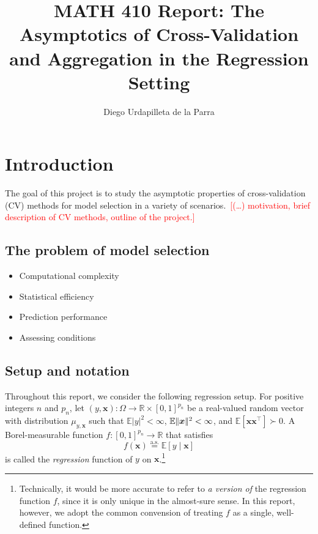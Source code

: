 \documentclass[11pt, letter paper]{article}
\title{MATH 410 Report: The Asymptotics of Cross-Validation and Aggregation in the Regression Setting}
\author{Diego Urdapilleta de la Parra}
\newcommand{\1}{\mathmybb{1}}
\newcommand{\R}{\mathbb{R}}
\newcommand{\0}{\emptyset}
\newcommand{\E}{\mathbb{E}}
\newcommand{\Ep}[1]{\mathbb{E}\left[ #1 \right]}
\newcommand{\norm}[1]{|\hspace{-1pt}|#1 |\hspace{-1pt}|}
\newcommand{\normsq}[1]{\norm{#1}^{2}}
\newcommand{\aseq}{\stackrel{\mathrm{a.s.}}{=}}
\newcommand{\x}{\boldsymbol{x}}
\begin{document}
\maketitle
\tableofcontents

\newpage
\section{Introduction}

The goal of this project is to study the asymptotic properties of cross-validation (CV) methods for model selection in a variety of scenarios.~\textcolor{red}{[(\ldots) motivation, brief description of CV methods, outline of the project.]}

\subsection{The problem of model selection}
\begin{itemize}
    \item Computational complexity
    \item Statistical efficiency
    \item Prediction performance
    \item Assessing conditions
\end{itemize}

\subsection{Setup and notation}

Throughout this report, we consider the following regression setup. For positive integers \(n\) and \(p_{n}\), let \((y, \x):\Omega\to\R\times[0,1]^{p_{n}}\) be a real-valued random vector with distribution \(\mu_{y, \x}\) such that \(\E{|y|^{2}}<\infty\), \(\E\normsq{\x}<\infty\), and \(\Ep{\x\x^{\top}}\succ 0\). A Borel-measurable function \(f:[0,1]^{p_{n}} \to \R\) that satisfies
\begin{equation}\label{eq:setup}
    f(\x) \aseq \Ep{y\mid \x}
\end{equation}
is called the \emph{regression} function of \(y\) on \(\x\).\footnote{Technically, it would be more accurate to refer to \emph{a version of} the regression function \(f\), since it is only unique in the almost-sure sense. In this report, however, we adopt the common convension of treating \(f\) as a single, well-defined function.}
\end{document}
